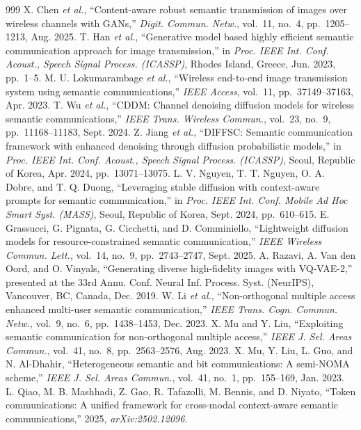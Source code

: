 \begin{thebibliography}{999}
 X. Chen \emph{et al.}, ``Content-aware robust semantic transmission of images over wireless channels with GANs,'' \emph{Digit. Commun. Netw.}, vol.~11, no.~4, pp.~1205--1213, Aug. 2025.
 T. Han \emph{et al.}, ``Generative model based highly efficient semantic communication approach for image transmission,'' in \emph{Proc. IEEE Int. Conf. Acoust., Speech Signal Process. (ICASSP)}, Rhodes Island, Greece, Jun. 2023, pp.~1--5.
 M. U. Lokumarambage \emph{et al.}, ``Wireless end-to-end image transmission system using semantic communications,'' \emph{IEEE Access}, vol.~11, pp.~37149--37163, Apr. 2023.
 T. Wu \emph{et al.}, ``CDDM: Channel denoising diffusion models for wireless semantic communications,'' \emph{IEEE Trans. Wireless Commun.}, vol.~23, no.~9, pp.~11168--11183, Sept. 2024.
 Z. Jiang \emph{et al.}, ``DIFFSC: Semantic communication framework with enhanced denoising through diffusion probabilistic models,'' in \emph{Proc. IEEE Int. Conf. Acoust., Speech Signal Process. (ICASSP)}, Seoul, Republic of Korea, Apr. 2024, pp.~13071--13075.
 L. V. Nguyen, T. T. Nguyen, O. A. Dobre, and T. Q. Duong, ``Leveraging stable diffusion with context-aware prompts for semantic communication,'' in \emph{Proc. IEEE Int. Conf. Mobile Ad Hoc Smart Syst. (MASS)}, Seoul, Republic of Korea, Sept. 2024, pp.~610--615.
 E. Grassucci, G. Pignata, G. Cicchetti, and D. Comminiello, ``Lightweight diffusion models for resource-constrained semantic communication,'' \emph{IEEE Wireless Commun. Lett.}, vol.~14, no.~9, pp.~2743--2747, Sept. 2025.
 A. Razavi, A. Van den Oord, and O. Vinyals, ``Generating diverse high-fidelity images with VQ-VAE-2,'' presented at the 33rd Annu. Conf. Neural Inf. Process. Syst. (NeurIPS), Vancouver, BC, Canada, Dec. 2019.
 W. Li \emph{et al.}, ``Non-orthogonal multiple access enhanced multi-user semantic communication,'' \emph{IEEE Trans. Cogn. Commun. Netw.}, vol.~9, no.~6, pp.~1438--1453, Dec. 2023.
 X. Mu and Y. Liu, ``Exploiting semantic communication for non-orthogonal multiple access,'' \emph{IEEE J. Sel. Areas Commun.}, vol.~41, no.~8, pp.~2563--2576, Aug. 2023.
 X. Mu, Y. Liu, L. Guo, and N. Al-Dhahir, ``Heterogeneous semantic and bit communications: A semi-NOMA scheme,'' \emph{IEEE J. Sel. Areas Commun.}, vol.~41, no.~1, pp.~155--169, Jan. 2023.
 L. Qiao, M. B. Mashhadi, Z. Gao, R. Tafazolli, M. Bennis, and D. Niyato, ``Token communications: A unified framework for cross-modal context-aware semantic communications,'' 2025, \emph{arXiv:2502.12096}.

\end{thebibliography}

